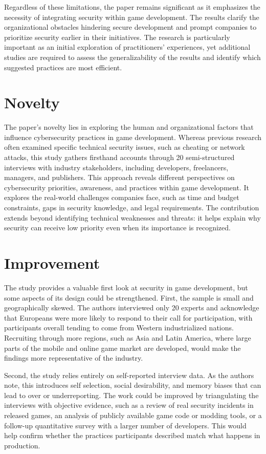 \documentclass[conference]{IEEEtran}
\begin{document}
Regardless of these limitations, the paper remains significant as it emphasizes the necessity of integrating security within game development. The results clarify the organizational obstacles hindering secure development and prompt companies to prioritize security earlier in their initiatives. The research is particularly important as an initial exploration of practitioners' experiences, yet additional studies are required to assess the generalizability of the results and identify which suggested practices are most efficient.

\section{Novelty}
The paper’s novelty lies in exploring the human and organizational factors that influence cybersecurity practices in game development. Whereas previous research often examined specific technical security issues, such as cheating or network attacks, this study gathers firsthand accounts through 20 semi-structured interviews with industry stakeholders, including developers, freelancers, managers, and publishers. This approach reveals different perspectives on cybersecurity priorities, awareness, and practices within game development. It explores the real-world challenges companies face, such as time and budget constraints, gaps in security knowledge, and legal requirements. The contribution extends beyond identifying technical weaknesses and threats: it helps explain why security can receive low priority even when its importance is recognized.

\section{Improvement}
The study provides a valuable first look at security in game development, but some aspects of its design could be strengthened. First, the sample is small and geographically skewed. The authors interviewed only 20 experts and acknowledge that Europeans were more likely to respond to their call for participation, with participants overall tending to come from Western industrialized nations. Recruiting through more regions, such as Asia and Latin America, where large parts of the mobile and online game market are developed, would make the findings more representative of the industry.

Second, the study relies entirely on self-reported interview data. As the authors note, this introduces self selection, social desirability, and memory biases that can lead to over or underreporting. The work could be improved by triangulating the interviews with objective evidence, such as a review of real security incidents in released games, an analysis of publicly available game code or modding tools, or a follow-up quantitative survey with a larger number of developers. This would help confirm whether the practices participants described match what happens in production.
\end{document}
